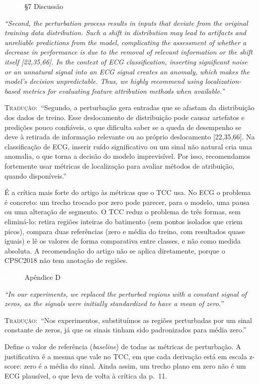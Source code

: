 \documentclass[11pt,a4paper]{article}
\newcommand{\pagechip}[1]{{\setlength{\fboxsep}{1.5pt}\colorbox{cAcc}{\textcolor{white}{\scriptsize\texttt{#1}}}}}
\newenvironment{origquote}{\par\itshape\small}{\par}
\newenvironment{tradquote}{\par\small\textsc{Tradução:}\ }{\par}
\newcommand{\explab}[1]{\par\smallskip{\small\color{cAcc}\textbf{\MakeUppercase{#1}}}\par}
\begin{document}
\begin{citacard}{\pagechip{p. 11} §7 Discussão}
\begin{origquote}“Second, the perturbation process results in inputs that deviate from the original training data distribution. Such a shift in distribution may lead to artifacts and unreliable predictions from the model, complicating the assessment of whether a decrease in performance is due to the removal of relevant information or the shift itself [22,35,66]. In the context of ECG classification, inserting significant noise or an unnatural signal into an ECG signal creates an anomaly, which makes the model’s decision unpredictable. Thus, we highly recommend using localization-based metrics for evaluating feature attribution methods when available.”\end{origquote}
\begin{tradquote}“Segundo, a perturbação gera entradas que se afastam da distribuição dos dados de treino. Esse deslocamento de distribuição pode causar artefatos e predições pouco confiáveis, o que dificulta saber se a queda de desempenho se deve à retirada de informação relevante ou ao próprio deslocamento [22,35,66]. Na classificação de ECG, inserir ruído significativo ou um sinal não natural cria uma anomalia, o que torna a decisão do modelo imprevisível. Por isso, recomendamos fortemente usar métricas de localização para avaliar métodos de atribuição, quando disponíveis.”\end{tradquote}
\explab{Explicação}
É a crítica mais forte do artigo às métricas que o TCC usa. No ECG o problema é concreto: um trecho trocado por zero pode parecer, para o modelo, uma pausa ou uma alteração de segmento. O TCC reduz o problema de três formas, sem eliminá-lo: retira regiões inteiras do batimento (sem pontos isolados que criem picos), compara duas referências (zero e média do treino, com resultados quase iguais) e lê os valores de forma comparativa entre classes, e não como medida absoluta. A recomendação do artigo não se aplica diretamente, porque o CPSC2018 não tem anotação de regiões.
\end{citacard}

\begin{citacard}{\pagechip{p. 14} Apêndice D}
\begin{origquote}“In our experiments, we replaced the perturbed regions with a constant signal of zeros, as the signals were initially standardized to have a mean of zero.”\end{origquote}
\begin{tradquote}“Nos experimentos, substituímos as regiões perturbadas por um sinal constante de zeros, já que os sinais tinham sido padronizados para média zero.”\end{tradquote}
\explab{Explicação}
Define o valor de referência (\textit{baseline}) de todas as métricas de perturbação. A justificativa é a mesma que vale no TCC, em que cada derivação está em escala z-score: zero é a média do sinal. Ainda assim, um trecho plano em zero não é um ECG plausível, o que leva de volta à crítica da p.~11.
\end{citacard}
\end{document}

